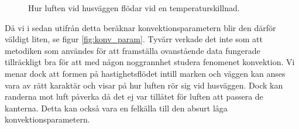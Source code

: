 \begin{figure}[hpbt]
\begin{center}
{}
\caption{\label{fig:velocityfield} Hur luften vid husväggen flödar vid en temperaturskillnad.}
\end{center}
\end{figure}

Då vi i sedan utifrån detta beräknar konvektionsparametern blir den därför väldigt liten, 
se figur \ref{fig:konv_param}. Tyvärr verkade det inte som att metodiken som användes 
för att framställa ovanstående data fungerade tillräckligt bra för att med någon 
noggrannhet studera fenomenet konvektion.  Vi menar dock att formen på hastighetsflödet intill marken och väggen
kan anses vara av rätt karaktär och visar på hur luften rör sig vid husväggen. Dock kan randerna mot
luft påverka då det ej var tillåtet för luften att passera de
kanterna. Detta kan också vara en felkälla till den absurt låga konvektionsparametern.



